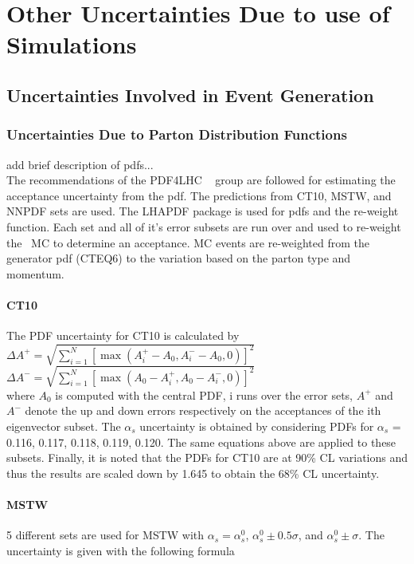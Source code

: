 \chapter{Other Uncertainties Due to use of Simulations}
\section{Uncertainties  Involved in Event Generation}
\subsection{Uncertainties Due to Parton Distribution Functions}	
add brief description of pdfs...\\

The recommendations of the PDF4LHC ~\cite{PDF4LHC} group are followed for estimating the acceptance uncertainty from the pdf. The predictions from CT10, MSTW, and NNPDF sets are used. The LHAPDF package is used for pdfs and the re-weight function. Each set and all of it's error subsets are run over and used to re-weight the \ttZ \ MC to determine an acceptance. MC events are re-weighted from the generator pdf (CTEQ6) to the variation based on the parton type and momentum.\\

\subsubsection{CT10}
The PDF uncertainty for CT10 is calculated by\\
$\Delta A^{+} = \sqrt{ \displaystyle \sum \limits_{i=1}^N [	\max(A_i^{+} - A_0, A_i^{-} - A_0, 0) ] ^ 2}$ \\
$\Delta A^{-} = \sqrt{ \displaystyle \sum \limits_{i=1}^N [	\max(A_0 - A_i^{+}, A_0 - A_i^{-} , 0) ] ^ 2}$\\
where $A_0$ is computed with the central PDF, i runs over the error sets, $A^{+}$ and $A^{-}$ denote the up and down errors respectively on the acceptances of the ith eigenvector subset. The $\alpha _s$ uncertainty is obtained by considering PDFs for $\alpha _s$ = 0.116, 0.117, 0.118, 0.119, 0.120. The same equations above are applied to these subsets. Finally, it is noted that the PDFs for CT10 are at 90\% CL variations and thus the results are scaled down by 1.645 to obtain the 68\% CL uncertainty.
	
\subsubsection{MSTW}
5 different sets are used for MSTW with $\alpha _s = \alpha _s ^ 0$, $\alpha _s ^ 0 \pm 0.5 \sigma$, and $\alpha _s ^ 0 \pm \sigma$. The uncertainty is given with the following formula\\


